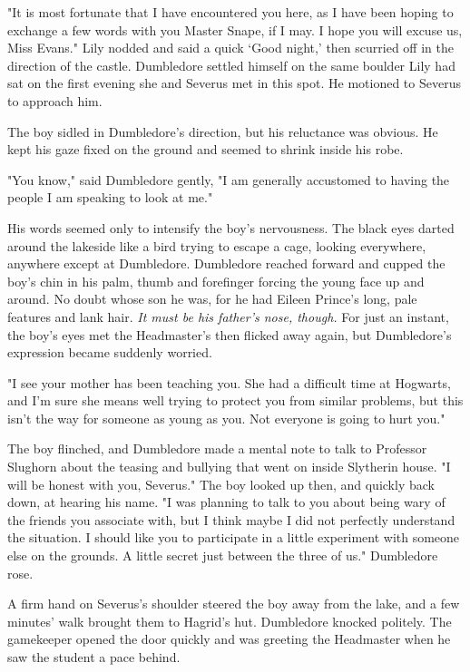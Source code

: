 "It is most fortunate that I have encountered you here, as I have been hoping to exchange a few words with you Master Snape, if I may. I hope you will excuse us, Miss Evans." Lily nodded and said a quick `Good night,' then scurried off in the direction of the castle. Dumbledore settled himself on the same boulder Lily had sat on the first evening she and Severus met in this spot. He motioned to Severus to approach him.

The boy sidled in Dumbledore's direction, but his reluctance was obvious. He kept his gaze fixed on the ground and seemed to shrink inside his robe.

"You know," said Dumbledore gently, "I am generally accustomed to having the people I am speaking to look at me."

His words seemed only to intensify the boy's nervousness. The black eyes darted around the lakeside like a bird trying to escape a cage, looking everywhere, anywhere except at Dumbledore. Dumbledore reached forward and cupped the boy's chin in his palm, thumb and forefinger forcing the young face up and around. No doubt whose son he was, for he had Eileen Prince's long, pale features and lank hair. \emph{It must be his father's nose, though.} For just an instant, the boy's eyes met the Headmaster's then flicked away again, but Dumbledore's expression became suddenly worried.

"I see your mother has been teaching you. She had a difficult time at Hogwarts, and I'm sure she means well trying to protect you from similar problems, but this isn't the way for someone as young as you. Not everyone is going to hurt you."

The boy flinched, and Dumbledore made a mental note to talk to Professor Slughorn about the teasing and bullying that went on inside Slytherin house. "I will be honest with you, Severus." The boy looked up then, and quickly back down, at hearing his name. "I was planning to talk to you about being wary of the friends you associate with, but I think maybe I did not perfectly understand the situation. I should like you to participate in a little experiment with someone else on the grounds. A little secret just between the three of us." Dumbledore rose.

A firm hand on Severus's shoulder steered the boy away from the lake, and a few minutes' walk brought them to Hagrid's hut. Dumbledore knocked politely. The gamekeeper opened the door quickly and was greeting the Headmaster when he saw the student a pace behind.

